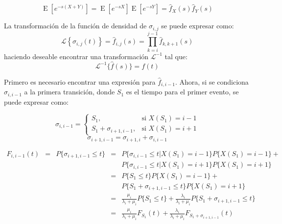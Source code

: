 \documentclass[11pt]{article}
\numberwithin{equation}{section} %
\begin{document}
\begin{equation}
\operatorname{E}[e^{-s(X+Y)}]=\operatorname{E}[e^{-sX}]\operatorname{E}[e^{-sY}]=\hat{f}_{X}(s)\hat{f}_{Y}(s)
\end{equation}

La transformación de la función de densidad de $\sigma_{i,j}$ se puede expresar como:
\begin{equation} \label{eq:laplacesum}
\mathcal{L} \left\{\sigma_{i,j}(t)\right\}=\hat{f}_{i,j}(s)=\prod_{k=i}^{j-1}\hat{f}_{k,k+1}(s)
\end{equation}
haciendo deseable encontrar una transformación $\mathcal{L}^{-1}$ tal que:
\begin{equation}
\mathcal{L}^{-1}\{\hat{f}(s)\}=f(t)
\end{equation}

Primero es necesario encontrar una expresión para $\hat{f}_{i,i-1}$. Ahora, si se condiciona $\sigma_{i,i-1}$ a la primera transición, donde $S_1$ es el tiempo para el primer evento, se puede expresar como:

\begin{equation}
\sigma_{i,i-1} =
\begin{cases}
S_{1}, & \mbox{si } X(S_{1})=i-1 \\
S_{1}+\sigma_{i+1,i-1}, & \mbox{si } X(S_{1})=i+1
\end{cases}
\end{equation}
\begin{equation}
\sigma_{i+1,i-1}=\sigma_{i+1,i}+\sigma_{i,i-1}
\end{equation}

\[
\begin{array}{rcrcl}
F_{i,i-1}(t) & = & P\{ \sigma_{i+1,i-1}\leq t \} & = & P\{ \sigma_{i,i-1}\leq t | X(S_{1})=i-1 \}P\{ X(S_{1})=i-1 \} +\\
 & & & & P\{ \sigma_{i,i-1}\leq t | X(S_{1})=i+1 \}P\{ X(S_{1})=i+1 \} \\
 & & & = & P\{ S_{1}\leq t\}P\{ X(S_{1})=i-1 \} +\\
 & & & & P\{ S_{1} + \sigma_{i+1,i-1}\leq t\}P\{ X(S_{1})=i+1 \} \\
 & & & = & \frac{\mu_{i}}{\lambda_{i}+\mu_{i}} P\{ S_{1}\leq t\} + \frac{\lambda_{i}}{\lambda_{i}+\mu_{i}} P\{ S_{1} + \sigma_{i+1,i-1}\leq t\}\\
 & & & = & \frac{\mu_{i}}{\lambda_{i}+\mu_{i}} F_{S_{1}}(t) + \frac{\lambda_{i}}{\lambda_{i}+\mu_{i}} F_{ S_{1} + \sigma_{i+1,i-1}}(t)\\
\end{array}
\]
\end{document}
